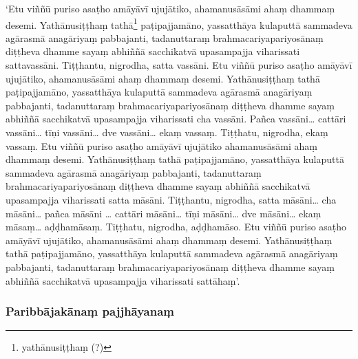 ‘Etu viññū puriso asaṭho amāyāvī ujujātiko, ahamanusāsāmi ahaṃ dhammaṃ desemi. Yathānusiṭṭhaṃ tathā\footnote{yathānusiṭṭhaṃ (?)} paṭipajjamāno, yassatthāya kulaputtā sammadeva agārasmā anagāriyaṃ pabbajanti, tadanuttaraṃ brahmacariyapariyosānaṃ diṭṭheva dhamme sayaṃ abhiññā sacchikatvā upasampajja viharissati sattavassāni. Tiṭṭhantu, nigrodha, satta vassāni. Etu viññū puriso asaṭho amāyāvī ujujātiko, ahamanusāsāmi ahaṃ dhammaṃ desemi. Yathānusiṭṭhaṃ tathā paṭipajjamāno, yassatthāya kulaputtā sammadeva agārasmā anagāriyaṃ pabbajanti, tadanuttaraṃ brahmacariyapariyosānaṃ diṭṭheva dhamme sayaṃ abhiññā sacchikatvā upasampajja viharissati cha vassāni. Pañca vassāni… cattāri vassāni… tīṇi vassāni… dve vassāni… ekaṃ vassaṃ. Tiṭṭhatu, nigrodha, ekaṃ vassaṃ. Etu viññū puriso asaṭho amāyāvī ujujātiko ahamanusāsāmi ahaṃ dhammaṃ desemi. Yathānusiṭṭhaṃ tathā paṭipajjamāno, yassatthāya kulaputtā sammadeva agārasmā anagāriyaṃ pabbajanti, tadanuttaraṃ brahmacariyapariyosānaṃ diṭṭheva dhamme sayaṃ abhiññā sacchikatvā upasampajja viharissati satta māsāni. Tiṭṭhantu, nigrodha, satta māsāni… cha māsāni… pañca māsāni … cattāri māsāni… tīṇi māsāni… dve māsāni… ekaṃ māsaṃ… aḍḍhamāsaṃ. Tiṭṭhatu, nigrodha, aḍḍhamāso. Etu viññū puriso asaṭho amāyāvī ujujātiko, ahamanusāsāmi ahaṃ dhammaṃ desemi. Yathānusiṭṭhaṃ tathā paṭipajjamāno, yassatthāya kulaputtā sammadeva agārasmā anagāriyaṃ pabbajanti, tadanuttaraṃ brahmacariyapariyosānaṃ diṭṭheva dhamme sayaṃ abhiññā sacchikatvā upasampajja viharissati sattāhaṃ’.

\subsubsection{Paribbājakānaṃ pajjhāyanaṃ}

